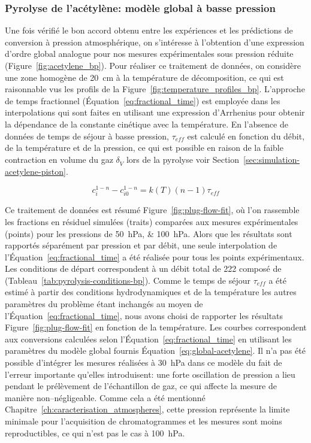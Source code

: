 \subsubsection{Pyrolyse de l'acétylène: modèle global à basse pression}
\label{sec:simulation-acetylene-melange-bp}

Une fois vérifié le bon accord obtenu entre les expériences et les prédictions de conversion à pression atmosphérique, on s'intéresse à l'obtention d'une expression d'ordre global analogue pour nos mesures expérimentales sous pression réduite (Figure~\ref{fig:acetylene_bp}). Pour réaliser ce traitement de données, on considère une zone homogène de \SI{20}{\centi\metre} à la température de décomposition, ce qui est raisonnable vus les profils de la Figure~\ref{fig:temperature_profiles_bp}. L'approche de temps fractionnel (Équation~\ref{eq:fractional_time}) est employée dans les interpolations qui sont faites en utilisant une expression d'Arrhenius pour obtenir la dépendance de la constante cinétique avec la température. En l'absence de données de temps de séjour à basse pression, $\tau_{eff}$ est calculé en fonction du débit, de la température et de la pression, ce qui est possible en raison de la faible contraction en volume du gaz $\delta_{\dot{V}}$ lors de la pyrolyse \textemdash{} voir Section~\ref{sec:simulation-acetylene-piston}.

\begin{equation}
c_{i}^{1-n}-c_{i0}^{1-n}=k(T)(n-1)\tau_{eff}
\label{eq:fractional_time}
\end{equation}

Ce traitement de données est résumé Figure~\ref{fig:plug-flow-fit}, où l'on rassemble les fractions en  résiduel simulées (traits) comparées aux mesures expérimentales (points) pour les pressions de \SIlist{50;100}{\hecto\pascal}. Alors que les résultats sont rapportés séparément par pression et par débit, une seule interpolation de l'Équation~\ref{eq:fractional_time} a été réalisée pour tous les points expérimentaux. Les conditions de départ correspondent à un débit total de \SI{222}{\sccm} composé de  (Tableau~\ref{tab:pyrolysis-conditions-bp}). Comme le temps de séjour $\tau_{eff}$ a été estimé à partir des conditions hydrodynamiques et de la température \textendash{} les autres paramètres du problème étant inchangés \textendash{} au moyen de l'Équation~\ref{eq:fractional_time}, nous avons choisi de rapporter les résultats Figure~\ref{fig:plug-flow-fit} en fonction de la température. Les courbes correspondent aux conversions calculées selon l'Équation~\ref{eq:fractional_time} en utilisant les paramètres du modèle global fournis Équation~\ref{eq:global-acetylene}. Il n'a pas été possible d'intégrer les mesures réalisées à \SI{30}{\hecto\pascal} dans ce modèle du fait de l'erreur importante qu'elles introduisent: une forte oscillation de pression a lieu pendant le prélèvement de l'échantillon de gaz, ce qui affecte la mesure de manière non--négligeable. Comme cela a été mentionné Chapitre~\ref{ch:caracterisation_atmospheres}, cette pression représente la limite minimale pour l'acquisition de chromatogrammes et les mesures sont moins reproductibles, ce qui n'est pas le cas à \SI{100}{\hecto\pascal}. 

